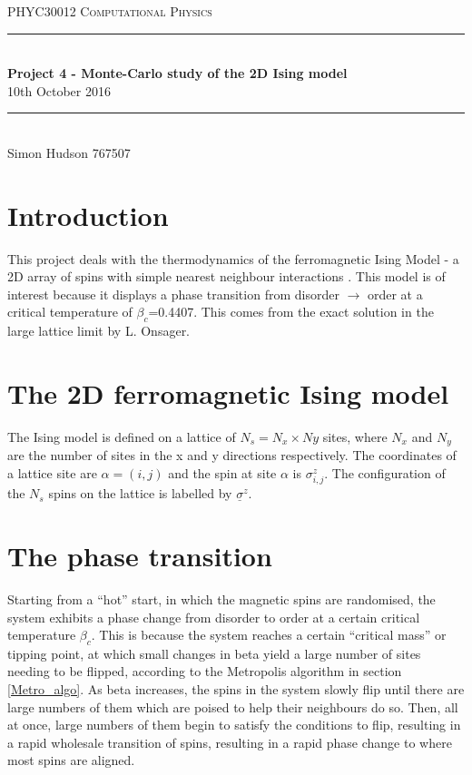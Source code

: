 \documentclass[a4paper]{article}
\newcommand{\HRule}{\rule{\linewidth}{0.5mm}}
\begin{document}
\begin{center}
\textsc{\Large PHYC30012 Computational Physics}\\[0.3cm]

\HRule \\[0.4cm]

{\LARGE \bfseries Project 4 - Monte-Carlo study of the 2D Ising model \\[0.4cm] }
{\Large 10th October 2016 \\}

\HRule \\[0.3cm]

{\large Simon Hudson 767507\\[0.5cm]}

\end{center}

\section{Introduction}
This project deals with the thermodynamics of the ferromagnetic Ising Model - a 2D array of spins with simple nearest neighbour interactions \cite{Manual}. This model is of interest because it displays a phase transition from disorder $\rightarrow$ order at a critical temperature of $\beta_c$=0.4407. This comes from the exact solution in the large lattice limit by L. Onsager.\\

\section{The 2D ferromagnetic Ising model}\label{2D_ferr_mag_I_model}
The Ising model is defined on a lattice of $N_s=N_x \times Ny$ sites, where $N_x$ and $N_y$ are the number of sites in the x and y directions respectively. The coordinates of a lattice site are $\alpha=(i,j)$ and the spin at site $\alpha$ is $\sigma_{i,j}^{z}$. The configuration of the $N_s$ spins on the lattice is labelled by $\underline{\sigma}^z$.\\

\section{The phase transition}\label{Phase_trans}
Starting from a ``hot'' start, in which the magnetic spins are randomised, the system exhibits a phase change from disorder to order at a certain critical temperature $\beta_c$. This is because the system reaches a certain ``critical mass'' or tipping point, at which small changes in beta yield a large number of sites needing to be flipped, according to the Metropolis algorithm in section \ref{Metro_algo}. As beta increases, the spins in the system slowly flip until there are large numbers of them which are poised to help their neighbours do so. Then, all at once, large numbers of them begin to satisfy the conditions to flip, resulting in a rapid wholesale transition of spins, resulting in a rapid phase change to where most spins are aligned.
\end{document}
